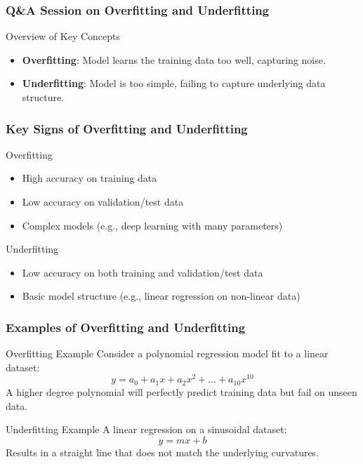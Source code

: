 \documentclass[aspectratio=169]{beamer}
\begin{document}
\begin{frame}[fragile]
    \frametitle{Q\&A Session on Overfitting and Underfitting}
    \begin{block}{Overview of Key Concepts}
        \begin{itemize}
            \item \textbf{Overfitting}: Model learns the training data too well, capturing noise. 
            \item \textbf{Underfitting}: Model is too simple, failing to capture underlying data structure.
        \end{itemize}
    \end{block}
\end{frame}

\begin{frame}[fragile]
    \frametitle{Key Signs of Overfitting and Underfitting}
    \begin{block}{Overfitting}
        \begin{itemize}
            \item High accuracy on training data 
            \item Low accuracy on validation/test data
            \item Complex models (e.g., deep learning with many parameters)
        \end{itemize}
    \end{block}

    \begin{block}{Underfitting}
        \begin{itemize}
            \item Low accuracy on both training and validation/test data
            \item Basic model structure (e.g., linear regression on non-linear data)
        \end{itemize}
    \end{block}
\end{frame}

\begin{frame}[fragile]
    \frametitle{Examples of Overfitting and Underfitting}
    \begin{block}{Overfitting Example}
        Consider a polynomial regression model fit to a linear dataset:
        \begin{equation}
            y = a_0 + a_1x + a_2x^2 + \ldots + a_{10}x^{10}
        \end{equation}
        A higher degree polynomial will perfectly predict training data but fail on unseen data.
    \end{block}

    \begin{block}{Underfitting Example}
        A linear regression on a sinusoidal dataset:
        \begin{equation}
            y = mx + b
        \end{equation}
        Results in a straight line that does not match the underlying curvatures.
    \end{block}
\end{frame}
\end{document}
